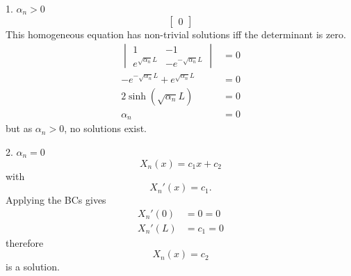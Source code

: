 \documentclass{article}
\begin{document}
\begin{proofcase}{1. \(\alpha_n > 0\)}
\begin{equation*}
\begin{bmatrix*}
            0
        \end{bmatrix*}
    \end{equation*}
    This homogeneous equation has non-trivial solutions iff the determinant is zero.
    \begin{align*}
        \begin{vmatrix*}
            1 & -1 \\
            e^{\sqrt{\alpha_n} L} & -e^{-\sqrt{\alpha_n} L}
        \end{vmatrix*} & = 0        \\
        -e^{-\sqrt{\alpha_n} L} + e^{\sqrt{\alpha_n} L}         & = 0 \\
        2\sinh{\left( \sqrt{\alpha_n} L \right)}                & = 0 \\
        \alpha_n                                                & = 0
    \end{align*}
    but as \(\alpha_n > 0\), no solutions exist.
\end{proofcase}
\begin{proofcase}{2. \(\alpha_n = 0\)}\let\qed\relax
    \begin{equation*}
        X_n\left( x \right) = c_1 x + c_2
    \end{equation*}
    with
    \begin{equation*}
        X_n'\left( x \right) = c_1.
    \end{equation*}
    Applying the BCs gives
    \begin{align*}
        X_n'\left( 0 \right) & = 0 = 0   \\
        X_n'\left( L \right) & = c_1 = 0
    \end{align*}
    therefore
    \begin{equation*}
        X_n\left( x \right) = c_2
    \end{equation*}
    is a solution.
\end{proofcase}
\end{document}
